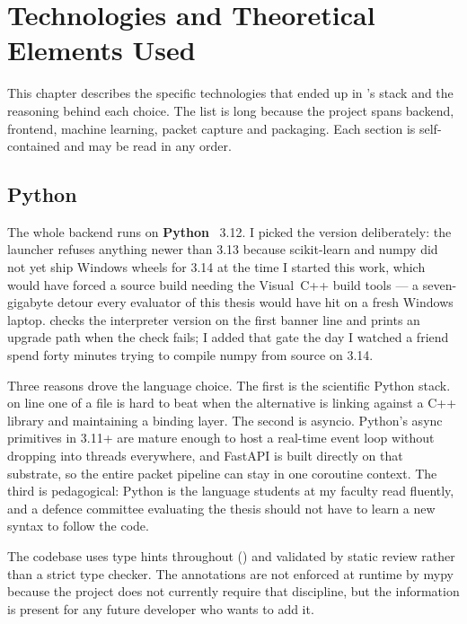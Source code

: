 \chapter{Technologies and Theoretical Elements Used}
\label{chap:technologies}

This chapter describes the specific technologies that ended up in
\nidsname{}'s stack and the reasoning behind each choice. The list is
long because the project spans backend, frontend, machine learning,
packet capture and packaging. Each section is self-contained and may
be read in any order.

\section{Python}
\label{sec:tech-python}

The whole backend runs on \textbf{Python}~\cite{python} 3.12. I
picked the version deliberately: the launcher refuses anything
newer than 3.13 because scikit-learn and numpy did not yet ship
Windows wheels for 3.14 at the time I started this work, which
would have forced a source build needing the Visual~C++ build
tools --- a seven-gigabyte detour every evaluator of this thesis
would have hit on a fresh Windows laptop.  checks the
interpreter version on the first banner line and prints an
upgrade path when the check fails; I added that gate the day I
watched a friend spend forty minutes trying to compile numpy from
source on 3.14.

Three reasons drove the language choice. The first is the
scientific Python stack.  on line one of a file is hard to beat
when the alternative is linking against a C++ library and
maintaining a binding layer. The second is asyncio. Python's
async primitives in 3.11+ are mature enough to host a real-time
event loop without dropping into threads everywhere, and FastAPI
is built directly on that substrate, so the entire packet
pipeline can stay in one coroutine context. The third is
pedagogical: Python is the language students at my faculty read
fluently, and a defence committee evaluating the thesis should
not have to learn a new syntax to follow the code.

The codebase uses type hints throughout () and validated by static review rather than a strict type
checker. The annotations are not enforced at runtime by mypy because
the project does not currently require that discipline, but the
information is present for any future developer who wants to add it.

